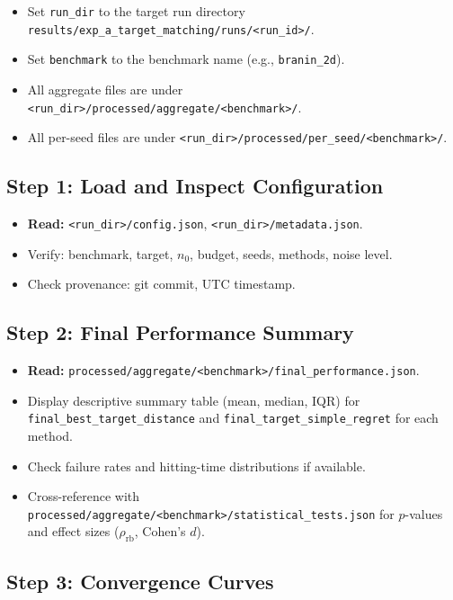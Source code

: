 \documentclass[11pt]{article}
\begin{document}
\begin{itemize}
  \item Set \texttt{run\_dir} to the target run directory
        \texttt{results/exp\_a\_target\_matching/runs/<run\_id>/}.
  \item Set \texttt{benchmark} to the benchmark name (e.g., \texttt{branin\_2d}).
  \item All aggregate files are under
        \texttt{<run\_dir>/processed/aggregate/<benchmark>/}.
  \item All per-seed files are under
        \texttt{<run\_dir>/processed/per\_seed/<benchmark>/}.
\end{itemize}
 
\subsection{Step 1: Load and Inspect Configuration}
 
\begin{itemize}
  \item \textbf{Read:} \texttt{<run\_dir>/config.json},
        \texttt{<run\_dir>/metadata.json}.
  \item Verify: benchmark, target, $n_0$, budget, seeds, methods, noise level.
  \item Check provenance: git commit, UTC timestamp.
\end{itemize}
 
\subsection{Step 2: Final Performance Summary}
 
\begin{itemize}
  \item \textbf{Read:} \texttt{processed/aggregate/<benchmark>/final\_performance.json}.
  \item Display descriptive summary table (mean, median, IQR) for
        \texttt{final\_best\_target\_distance} and
        \texttt{final\_target\_simple\_regret} for each method.
  \item Check failure rates and hitting-time distributions if available.
  \item Cross-reference with
        \texttt{processed/aggregate/<benchmark>/statistical\_tests.json}
        for $p$-values and effect sizes ($\rho_{\mathrm{rb}}$, Cohen's $d$).
\end{itemize}
 
\subsection{Step 3: Convergence Curves}
 
\end{document}
